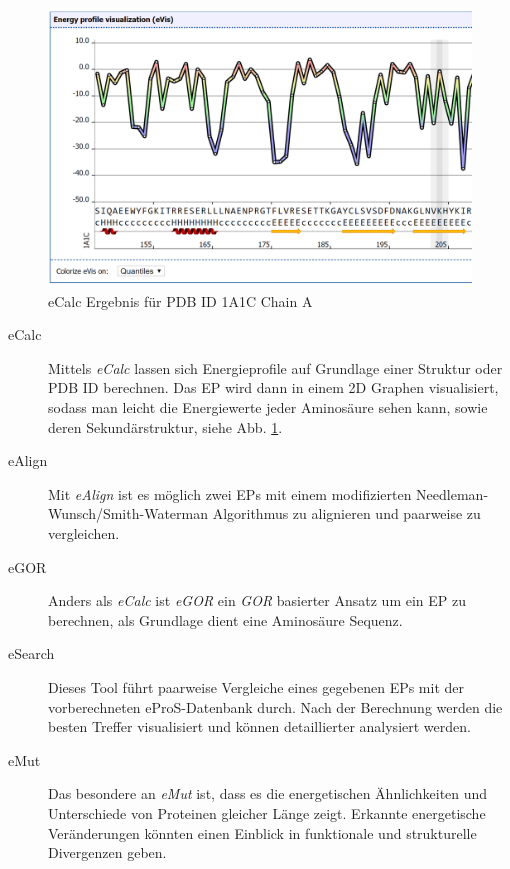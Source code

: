 \begin{figure}
\includegraphics[width=.95\textwidth]{images/ePros.png}
\caption{eCalc Ergebnis für \ac{PDB} ID 1A1C Chain A}
\label{fig:epros}
\end{figure}

\begin{description}
\item[eCalc]
Mittels \emph{eCalc} lassen sich Energieprofile auf Grundlage einer Struktur oder \ac{PDB} ID berechnen. Das EP wird dann in einem 2D Graphen visualisiert, sodass man leicht die Energiewerte jeder Aminosäure sehen kann, sowie deren Sekundärstruktur, siehe Abb. \ref{fig:epros}.
\item[eAlign]
Mit \emph{eAlign} ist es möglich zwei EPs mit einem modifizierten Needleman-Wunsch/Smith-Waterman Algorithmus zu alignieren und paarweise zu vergleichen.
\item[eGOR]
Anders als \emph{eCalc} ist \emph{eGOR} ein \emph{GOR}\cite{Garnier.1996} basierter Ansatz um ein EP zu berechnen, als Grundlage dient eine Aminosäure Sequenz.
\item[eSearch]
Dieses Tool führt paarweise Vergleiche eines gegebenen EPs mit der vorberechneten eProS-Datenbank durch. Nach der Berechnung werden die besten Treffer visualisiert und können detaillierter analysiert werden.
\item[eMut]
Das besondere an \emph{eMut} ist, dass es die energetischen Ähnlichkeiten und Unterschiede von Proteinen gleicher Länge zeigt. Erkannte energetische Veränderungen könnten einen Einblick in funktionale und strukturelle Divergenzen geben.
\end{description}


